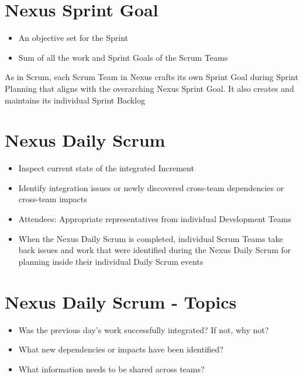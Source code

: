 \documentclass[a4paper,11pt,twocolumn]{article}
\begin{document}
\section*{Nexus Sprint Goal}
\begin{itemize}
	\item An objective set for the Sprint
	\item Sum of all the work and Sprint Goals of the Scrum Teams
\end{itemize}

\begin{tcolorbox}[colback=black!8!white,colframe=gray!50!black,title=Note,sharp corners,fonttitle=\normalsize\bfseries,fontupper=\normalsize]
	As in Scrum, each Scrum Team in Nexus crafts its own Sprint Goal during Sprint Planning that aligns with the overarching Nexus Sprint Goal. It also creates and maintains its individual Sprint Backlog
\end{tcolorbox}

\section*{Nexus Daily Scrum}
\begin{itemize}
	\item Inspect current state of the integrated Increment
	\item Identify integration issues or newly discovered cross-team dependencies or cross-team impacts
	\item Attendees: Appropriate representatives from individual Development Teams
	\item When the Nexus Daily Scrum is completed, individual Scrum Teams take back issues and work that were identified during the Nexus Daily Scrum for planning inside their individual Daily Scrum events
\end{itemize}

\section*{Nexus Daily Scrum - Topics}
\begin{itemize}
	\item Was the previous day's work successfully integrated? If not, why not?
	\item What new dependencies or impacts have been identified?
	\item What information needs to be shared across teams?
\end{itemize}
\end{document}
